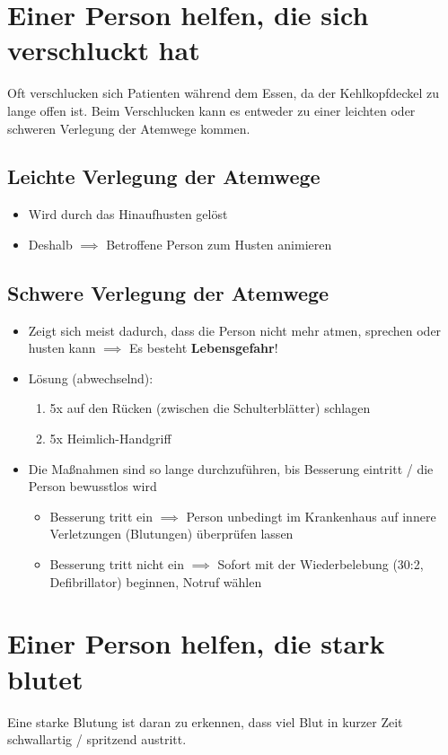 \chapter{Einer Person helfen, die sich verschluckt hat}
Oft verschlucken sich Patienten während dem Essen, da der Kehlkopfdeckel zu lange offen ist. Beim Verschlucken kann es entweder zu einer leichten oder schweren Verlegung der Atemwege kommen.

\section{Leichte Verlegung der Atemwege}
\begin{itemize}
    \item Wird durch das Hinaufhusten gelöst
    \item Deshalb $\implies$ Betroffene Person zum Husten animieren
\end{itemize}

\section{Schwere Verlegung der Atemwege}
\begin{itemize}
    \item Zeigt sich meist dadurch, dass die Person nicht mehr atmen, sprechen oder husten kann $\implies$ Es besteht \textbf{Lebensgefahr}!
    \item Lösung (abwechselnd):
    \begin{enumerate}
        \item 5x auf den Rücken (zwischen die Schulterblätter) schlagen
        \item 5x Heimlich-Handgriff
    \end{enumerate}
    \item Die Maßnahmen sind so lange durchzuführen, bis Besserung eintritt / die Person bewusstlos wird
    \begin{itemize}
        \item Besserung tritt ein $\implies$ Person unbedingt im Krankenhaus auf innere Verletzungen (Blutungen) überprüfen lassen
        \item Besserung tritt nicht ein $\implies$ Sofort mit der Wiederbelebung (30:2, Defibrillator) beginnen, Notruf wählen
    \end{itemize}
\end{itemize}

\chapter{Einer Person helfen, die stark blutet}
Eine starke Blutung ist daran zu erkennen, dass viel Blut in kurzer Zeit schwallartig / spritzend austritt.
